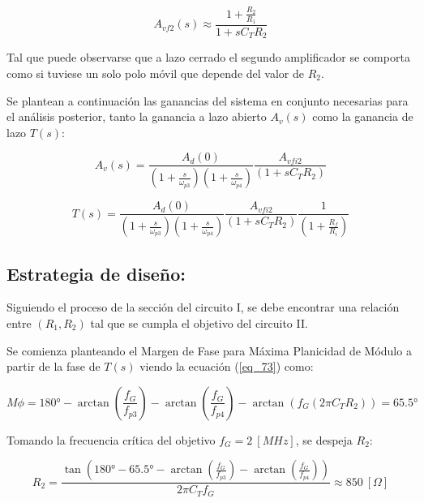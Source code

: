 \documentclass[12pt,a4paper]{article}
\begin{document}
\begin{equation}
        \label{eq_71}
A_{vf2}(s) \approx \frac{1+\frac{R_2}{R_1}}{1 + sC_TR_2}
\end{equation}
\hspace{0.5 cm}

Tal que puede observarse que a lazo cerrado el segundo amplificador se comporta como si tuviese un solo polo móvil que depende del valor de $R_2$.

Se plantean a continuación las ganancias del sistema en conjunto necesarias para el análisis posterior, tanto la ganancia a lazo abierto $A_v(s)$ como la ganancia de lazo $T(s)$:

\begin{equation}
\label{eq_72}
A_v(s) = \frac{A_d(0)}{\left(1+\frac{s}{\omega_{p3}}\right)\left(1+\frac{s}{\omega_{p4}}\right)}\frac{A_{vfi2}}{(1 + sC_TR_2)}
\end{equation}

\begin{equation}
\label{eq_73}
T(s) = \frac{A_d(0)}{\left(1+\frac{s}{\omega_{p3}}\right)\left(1+\frac{s}{\omega_{p4}}\right)}\frac{A_{vfi2}}{(1 + sC_TR_2)}
\frac{1}{\left(1+\frac{R_f}{R_i}\right)}
\end{equation}
\hspace{0.5 cm}

\subsection{Estrategia de diseño:}

Siguiendo el proceso de la sección del circuito I, se debe encontrar una relación entre $(R_1,R_2)$ tal que se cumpla el objetivo del circuito II.

Se comienza planteando el Margen de Fase para Máxima Planicidad de Módulo a partir de la fase de $T(s)$ viendo la ecuación (\ref{eq_73}) como:

\begin{equation}
\label{eq_74}
M\phi = \ang{180} - \arctan\left(\frac{f_G}{f_{p3}}\right) - \arctan\left(\frac{f_G}{f_{p4}}\right) - \arctan\left(f_G(2\pi C_TR_2)\right) = \ang{65,5}
\end{equation}
\hspace{0.5 cm}

Tomando la frecuencia crítica del objetivo $f_G=2~[MHz]$, se despeja $R_2$:

\begin{equation}
\label{eq_75}
R_2 = \frac{\tan\left(\ang{180} - \ang{65,5}  - \arctan\left(\frac{f_G}{f_{p3}}\right) - \arctan\left(\frac{f_G}{f_{p4}}\right)\right)}{2\pi C_Tf_G} \approx 850~[\Omega]
\end{equation}
\hspace{0.5 cm}
\end{document}
